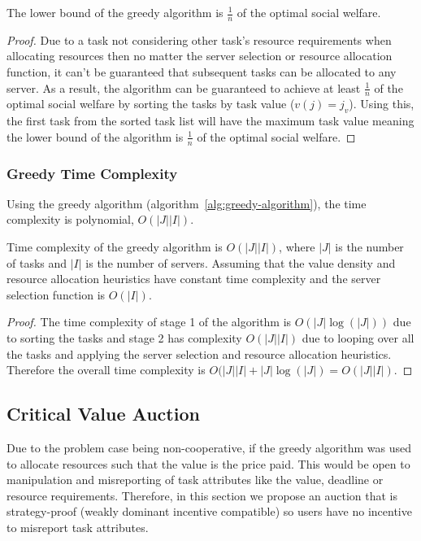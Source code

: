 \begin{theorem}
    The lower bound of the greedy algorithm is $\frac{1}{n}$ of the optimal social welfare.
\end{theorem}
\begin{proof}
    Due to a task not considering other task's resource requirements when allocating resources then no matter the
    server selection or resource allocation function, it can't be guaranteed that subsequent tasks can be allocated to
    any server. As a result, the algorithm can be guaranteed to achieve at least $\frac{1}{n}$ of the optimal social
    welfare by sorting the tasks by task value ($v(j) = j_v$). Using this, the first task from the sorted task list
    will have the maximum task value meaning the lower bound of the algorithm is $\frac{1}{n}$ of the optimal social
    welfare.
\end{proof}

\subsubsection{Greedy Time Complexity}
\label{subsubsec:greedy-time-complexity}
Using the greedy algorithm (algorithm~\ref{alg:greedy-algorithm}), the time complexity is polynomial,
$O(\left|J\right| \left|I\right|)$.
\begin{theorem}
    Time complexity of the greedy algorithm is $O(\left|J\right| \left|I\right|)$, where $\left|J\right|$ is the number
    of tasks and $\left|I\right|$ is the number of servers. Assuming that the value density and resource allocation
    heuristics have constant time complexity and the server selection function is $O(\left|I\right|)$.
\end{theorem}
\begin{proof}
    The time complexity of stage 1 of the algorithm is $O(\left|J\right| \log(\left|J\right|))$ due to sorting the
    tasks and stage 2 has complexity $O(\left|J\right| \left|I\right|)$ due to looping over all the tasks and
    applying the server selection and resource allocation heuristics. Therefore the overall time complexity is
    $O(\left|J\right| \left|I\right| + \left|J\right| \log(\left|J\right|) = O(\left|J\right| \left|I\right|)$.
\end{proof}

\subsection{Critical Value Auction}
\label{subsec:critical-value-auction}
Due to the problem case being non-cooperative, if the greedy algorithm was used to allocate resources such that the
value is the price paid. This would be open to manipulation and misreporting of task attributes like the value,
deadline or resource requirements. Therefore, in this section we propose an auction that is strategy-proof
(weakly dominant incentive compatible) so users have no incentive to misreport task attributes.

